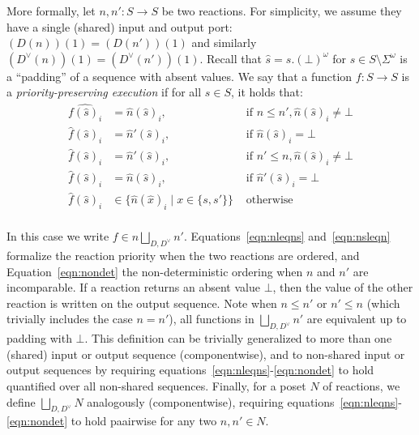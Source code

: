 More formally, let $n, n' : S \rightarrow S$ be two reactions.
For simplicity, we assume they have a single (shared) input and output port: $(D(n))(1) = (D(n'))(1)$ and similarly $(D^\vee(n))(1) = (D^\vee(n'))(1)$.
Recall that $\hat s = s.(\bot)^\omega$ for $s \in S \setminus \Sigma^\omega$ is a ``padding'' of a sequence with absent values.
We say that a function $f : S \rightarrow S$ is a \emph{priority-preserving execution} if for all $s \in S$, it holds that:
\begin{align}
\label{eqn:nleqns} \hat{ f(\hat s)_i} &  =  \hat n(\hat s)_i, & \text{ if } n \leq n', \hat n(\hat s)_i \neq \bot \\
\label{eqn:nleqnsbot} \hat f(\hat s)_i &  =  \hat n'(\hat s)_i, & \text{ if } \hat n(\hat s)_i = \bot \\
\label{eqn:nsleqn} \hat f(\hat s)_i &  =  \hat n'(\hat s)_i, & \text{ if } n' \leq n, \hat n(\hat s)_i \neq \bot \\
\label{eqn:nleqnsbot} \hat f(\hat s)_i &  =  \hat n(\hat s)_i, & \text{ if } \hat n'(\hat s)_i = \bot \\
\label{eqn:nondet} \hat f(\hat s)_i &  \in \{ \hat n(\hat x)_i \mid x \in \{s,s'\} \} & \text{ otherwise }\\
\end{align}

In this case we write $f \in n \bigsqcup_{D,D^\vee} n'$.
Equations~\ref{eqn:nleqns} and~\ref{eqn:nsleqn} formalize the reaction priority when the two reactions are ordered, and Equation~\ref{eqn:nondet} the non-deterministic ordering when $n$ and $n'$ are incomparable.
If a reaction returns an absent value $\bot$, then the value of the other reaction is written on the output sequence.
Note when $n \leq n'$ or $n' \leq n$ (which trivially includes the case $n = n'$), all functions in $\bigsqcup_{D,D^\vee} n'$ are equivalent up to padding with $\bot$. 
This definition can be trivially generalized to more than one (shared) input or output sequence (componentwise), and to non-shared input or output sequences by requiring equations~\ref{eqn:nleqns}-\ref{eqn:nondet} to hold quantified over all non-shared sequences.
Finally, for a \ac{poset} $N$ of reactions, we define $\bigsqcup_{D,D^\vee} N$ analogously (componentwise), requiring equations~\ref{eqn:nleqns}-\ref{eqn:nondet} to hold paairwise for any two $n, n' \in N$.

